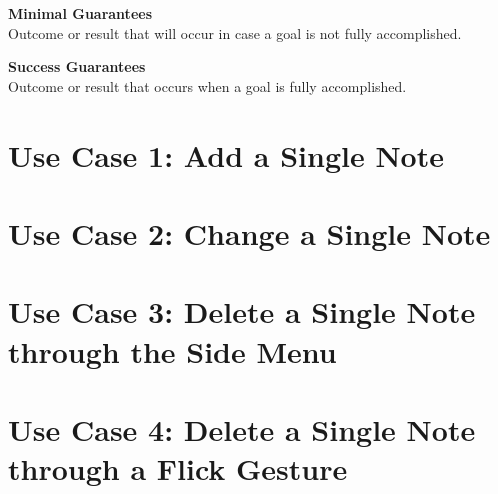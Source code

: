   \textbf{Minimal Guarantees} \\
  Outcome or result that will occur in case a goal is not fully accomplished.

  \textbf{Success Guarantees} \\
  Outcome or result that occurs when a goal is fully accomplished.




  \section{Use Case 1: Add a Single Note}


  \section{Use Case 2: Change a Single Note}


  \section{Use Case 3: Delete a Single Note through the Side Menu}


  \section{Use Case 4: Delete a Single Note through a Flick Gesture}

